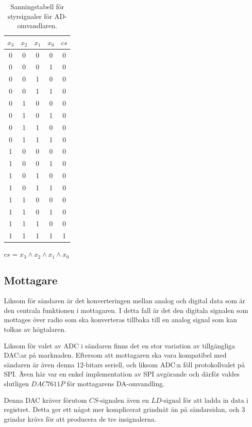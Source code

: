 \documentclass[a4paper,10pt]{article}
\begin{document}
\begin{table}
\centering
\begin{tabular}{| c c c c || c |}
\hline
$x_3$ & $x_2$ & $x_1$ & $x_0$ & $cs$ \\\hline
0 & 0 & 0 & 0 & 0 \\
0 & 0 & 0 & 1 & 0 \\
0 & 0 & 1 & 0 & 0 \\
0 & 0 & 1 & 1 & 0 \\
0 & 1 & 0 & 0 & 0 \\
0 & 1 & 0 & 1 & 0 \\
0 & 1 & 1 & 0 & 0 \\
0 & 1 & 1 & 1 & 0 \\
1 & 0 & 0 & 0 & 0 \\
1 & 0 & 0 & 1 & 0 \\
1 & 0 & 1 & 0 & 0 \\
1 & 0 & 1 & 1 & 0 \\
1 & 1 & 0 & 0 & 0 \\
1 & 1 & 0 & 1 & 0 \\
1 & 1 & 1 & 0 & 0 \\
1 & 1 & 1 & 1 & 1 \\
\hline
\end{tabular}

$cs$ = $x_3 \wedge x_2 \wedge x_1 \wedge x_0$

\caption{Sanningstabell för styrsignaler för AD-omvandlaren.}
\label{tab:adc}
\end{table}


\subsection{Mottagare}

Liksom för sändaren är det konverteringen mellan analog och digital data som
är den centrala funktionen i mottagaren. I detta fall är det den digitala 
signalen som mottages över radio som ska konverteras tillbaka till en analog
signal som kan tolkas av högtalaren.

Liksom för valet av ADC i sändaren finns det en stor variation av tillgängliga 
DAC:ar på marknaden. Eftersom att mottagaren ska vara kompatibel med sändaren
är även denna 12-bitars seriell, och liksom ADC:n föll protokollvalet på SPI. 
Även här var en enkel implementation av SPI avgörande och därför valdes 
slutligen $DAC7611P$ för mottagarens DA-omvandling. 

Denna DAC kräver förutom $CS$-signalen även en $LD$-signal för att ladda in data
i registret. Detta ger ett något mer komplicerat grindnät än på sändarsidan, och
3 grindar krävs för att producera de tre insignalerna.
\end{document}
